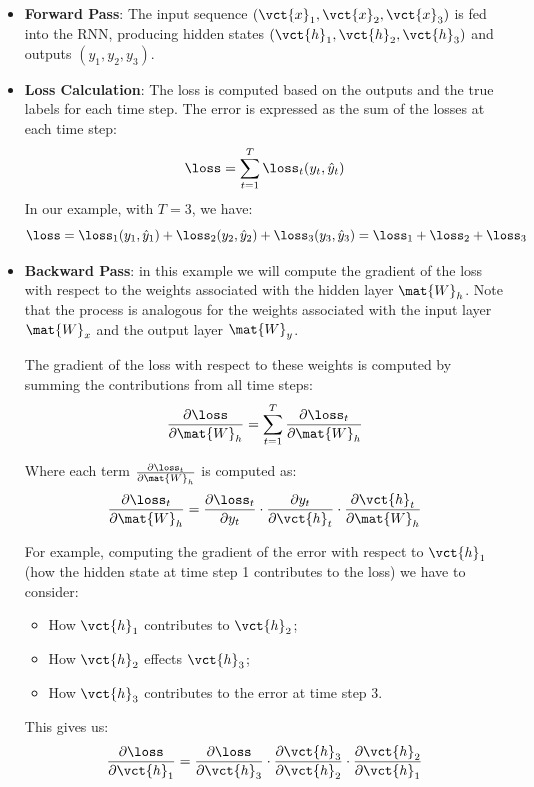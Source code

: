 \begin{itemize}
    \item \textbf{Forward Pass}: The input sequence $(\vct{x}_1, \vct{x}_2, \vct{x}_3)$ is fed into the RNN, producing hidden states $(\vct{h}_1, \vct{h}_2, \vct{h}_3)$ and outputs $(y_1, y_2, y_3)$.
    \item \textbf{Loss Calculation}: The loss is computed based on the outputs and the true labels for each time step.
    The error is expressed as the sum of the losses at each time step:
    \begin{equation}
        \loss = \sum_{t=1}^{T} \loss_t(y_t, \hat{y}_t)
    \end{equation}
    In our example, with $T=3$, we have:
    \begin{equation}
        \loss = \loss_1(y_1, \hat{y}_1) + \loss_2(y_2, \hat{y}_2) + \loss_3(y_3, \hat{y}_3) = \loss_1 + \loss_2 + \loss_3
    \end{equation}
    \item \textbf{Backward Pass}: in this example we will compute the gradient of the loss with respect to the weights associated with the hidden layer $\mat{W}_h$.
    Note that the process is analogous for the weights associated with the input layer $\mat{W}_x$ and the output layer $\mat{W}_y$.

    The gradient of the loss with respect to these weights is computed by summing the contributions from all time steps:
    \begin{equation}
        \frac{\partial \loss}{\partial \mat{W}_h} = \sum_{t=1}^{T} \frac{\partial \loss_t}{\partial \mat{W}_h}
    \end{equation}

    Where each term $\frac{\partial \loss_t}{\partial \mat{W}_h}$ is computed as:
    \begin{equation}
        \frac{\partial \loss_t}{\partial \mat{W}_h} = \frac{\partial \loss_t}{\partial y_t} \cdot \frac{\partial y_t}{\partial \vct{h}_t} \cdot \frac{\partial \vct{h}_t}{\partial \mat{W}_h}
    \end{equation}

    For example, computing the gradient of the error with respect to $\vct{h}_1$ (how the hidden state at time step 1 contributes to the loss) we have to consider:
    \begin{itemize}
        \item How $\vct{h}_1$ contributes to $\vct{h}_2$;
        \item How $\vct{h}_2$ effects $\vct{h}_3$;
        \item How $\vct{h}_3$ contributes to the error at time step 3.
    \end{itemize}
    This gives us:
    \begin{equation}
        \frac{\partial \loss}{\partial \vct{h}_1} = \frac{\partial \loss}{\partial \vct{h}_3} \cdot \frac{\partial \vct{h}_3}{\partial \vct{h}_2} \cdot \frac{\partial \vct{h}_2}{\partial \vct{h}_1}
    \end{equation}

\end{itemize}

